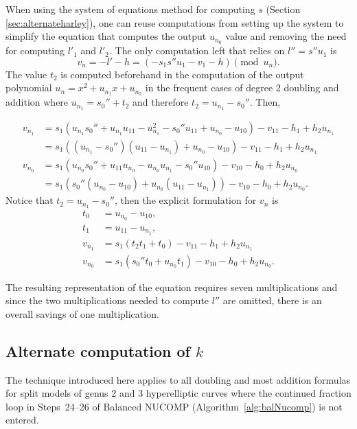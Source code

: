 When using the system of equations method for computing $s$ (Section
\ref{sec:alternateharley}), one can reuse computations from setting up the
system to simplify the equation that computes the output $u_{n_0}$ value and
removing the need for computing $l'_1$ and $l'_2$. The only computation left
that relies on $l'' = s''u_1$ is $$ v_n = -l' - h = (-s_1s''u_1 - v_1 - h)
\pmod{u_n}. $$ The value $t_2$ is computed beforehand in the computation of the
output polynomial $u_n = x^2 + u_{n_1}x + u_{n_0}$ in the frequent cases of
degree 2 doubling and addition where $u_{n_1} = s_0'' + t_2$ and therefore
$t_2 = u_{n_1} - s_0''$. Then,

\begin{align*}
    v_{n_1} &= s_1(u_{n_1}s_0''+ u_{n_1}u_{11} - u_{n_1}^2 - s_0''u_{11}
    + u_{n_0} - u_{10}) - v_{11} - h_1 + h_2u_{n_1}\\
            &= s_1((u_{n_1} - s_0'')(u_{11} - u_{n_1}) + u_{n_0} - u_{10}) - v_{11} - h_1 + h_2u_{n_1}\\
    v_{n_0} &= s_1(u_{n_0}s_0'' + u_{11}u_{n_0} - u_{n_0}u_{n_1} -s_0''u_{10}) - v_{10} - h_0 + h_2u_{n_0}\\
            &= s_1(s_0''(u_{n_0} - u_{10}) + u_{n_0}(u_{11} - u_{n_1})) - v_{10} - h_0 + h_2u_{n_0}.
\end{align*} 
Notice that $t_2 = u_{n_1} - s_0''$, then the explicit formulation for $v_n$ is 
\begin{align*}  
    t_0 &= u_{n_0} - u_{10},\\
    t_1 &= u_{11} - u_{n_1},\\
    v_{n_1} &= s_1(t_2t_1 + t_0) - v_{11} - h_1 + h_2u_{n_1}\\
    v_{n_0} &= s_1(s_0''t_0 + u_{n_0}t_1) - v_{10} - h_0 + h_2u_{n_0}.
\end{align*}

The resulting representation of the equation requires seven multiplications and
since the two multiplications needed to compute $l''$ are omitted,
there is an overall savings of one multiplication.

\subsection{Alternate computation of \texorpdfstring{$k$}{k}} 
\label{sec:alternatek}
The technique introduced here applies to all doubling and most addition
formulas for split models of genus 2 and 3 hyperelliptic curves where the
continued fraction loop in Steps~24--26 of Balanced NUCOMP
(Algorithm~\ref{alg:balNucomp}) is not entered. 

